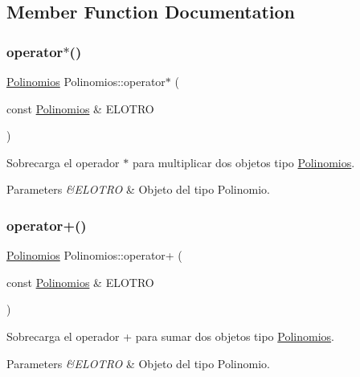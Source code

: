 \subsection{Member Function Documentation}
\hypertarget{class_polinomios_a2354ab7f6489e95a1373b0ae9e9d9ec0}{}\label{class_polinomios_a2354ab7f6489e95a1373b0ae9e9d9ec0} 
\subsubsection{\texorpdfstring{operator$\ast$()}{operator*()}}
{\ttfamily \hyperlink{class_polinomios}{Polinomios} Polinomios\+::operator$\ast$ (\begin{DoxyParamCaption}\item[{const \hyperlink{class_polinomios}{Polinomios} \&}]{E\+L\+O\+T\+RO }\end{DoxyParamCaption})}



Sobrecarga el operador $\ast$ para multiplicar dos objetos tipo \hyperlink{class_polinomios}{Polinomios}. 


\begin{DoxyParams}{Parameters}
{\em \&\+E\+L\+O\+T\+RO} & Objeto del tipo Polinomio. \\
\hline
\end{DoxyParams}
\hypertarget{class_polinomios_a57c9bd1d4b82e7f9a6ad08b4121c3eb6}{}\label{class_polinomios_a57c9bd1d4b82e7f9a6ad08b4121c3eb6} 
\subsubsection{\texorpdfstring{operator+()}{operator+()}}
{\ttfamily \hyperlink{class_polinomios}{Polinomios} Polinomios\+::operator+ (\begin{DoxyParamCaption}\item[{const \hyperlink{class_polinomios}{Polinomios} \&}]{E\+L\+O\+T\+RO }\end{DoxyParamCaption})}



Sobrecarga el operador + para sumar dos objetos tipo \hyperlink{class_polinomios}{Polinomios}. 


\begin{DoxyParams}{Parameters}
{\em \&\+E\+L\+O\+T\+RO} & Objeto del tipo Polinomio. \\
\hline
\end{DoxyParams}
\hypertarget{class_polinomios_a088a4ddc834ad371bf927f3e9be6f97d}{}\label{class_polinomios_a088a4ddc834ad371bf927f3e9be6f97d} 
